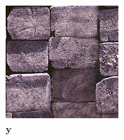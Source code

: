 \begin{figure}[]
\begin{subfigure}{\textwidth}
        \begin{subfigure}{0.19\textwidth}
            \centering
            \includegraphics[width=\textwidth]{images/04-experiment03/staircase_beams_target.jpg}
            \caption*{\(\bm{y}\)}
        \end{subfigure}
        \hfill
        \begin{subfigure}{0.19\textwidth}
            \centering
\end{subfigure}
\end{subfigure}
\end{figure}
